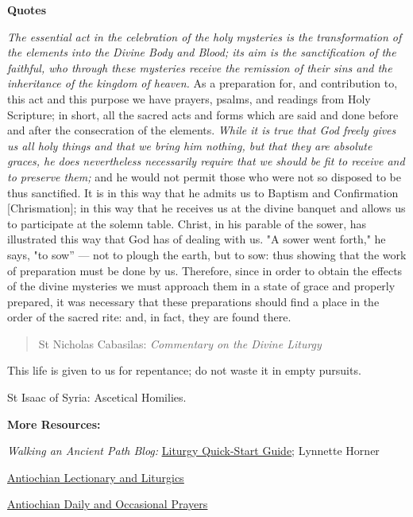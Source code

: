 \documentclass[
]{article}
\begin{document}
\textbf{Quotes}

\emph{The essential act in the celebration of the holy mysteries is the
transformation of the elements into the Divine Body and Blood; its aim
is the sanctification of the faithful, who through these mysteries
receive the remission of their sins and the inheritance of the kingdom
of heaven.} As a preparation for, and contribution to, this act and this
purpose we have prayers, psalms, and readings from Holy Scripture; in
short, all the sacred acts and forms which are said and done before and
after the consecration of the elements. \emph{While it is true that God
freely gives us all holy things and that we bring him nothing, but that
they are absolute graces, he does nevertheless necessarily require that
we should be fit to receive and to preserve them;} and he would not
permit those who were not so disposed to be thus sanctified. It is in
this way that he admits us to Baptism and Confirmation
{[}Chrismation{]}; in this way that he receives us at the divine banquet
and allows us to participate at the solemn table. Christ, in his parable
of the sower, has illustrated this way that God has of dealing with us.
"A sower went forth," he says, "to sow'' --- not to plough the earth,
but to sow: thus showing that the work of preparation must be done by
us. Therefore, since in order to obtain the effects of the divine
mysteries we must approach them in a state of grace and properly
prepared, it was necessary that these preparations should find a place
in the order of the sacred rite: and, in fact, they are found there.

\begin{quote}
St Nicholas Cabasilas: \emph{Commentary on the Divine Liturgy}
\end{quote}

This life is given to us for repentance; do not waste it in empty
pursuits.

St Isaac of Syria: Ascetical Homilies.

\textbf{More Resources:}

\emph{Walking an Ancient Path Blog:}
\href{https://blogs.ancientfaith.com/walkinganancientpath/2021/10/27/liturgy-quick-start-guide-1-introduction-trail-map/}{\ul{Liturgy
Quick-Start Guide}}; Lynnette Horner

\href{https://antiochian.org/liturgicday}{\ul{Antiochian Lectionary and
Liturgics}}

\href{https://antiochian.org/dashboard?name=Orthodox\%20Prayers}{\ul{Antiochian
Daily and Occasional Prayers}}
\end{document}
